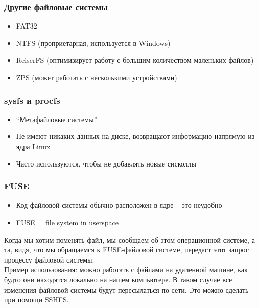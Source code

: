   \subsubsection{Другие файловые системы}
    \begin{itemize}
      \item FAT32
      \item NTFS (проприетарная, используется в Windows)
      \item ReiserFS (оптимизирует работу с большим количеством маленьких файлов)
      \item ZPS (может работать с несколькими устройствами)
    \end{itemize}
  
  \subsubsection{sysfs и procfs}
    \begin{itemize}
      \item ``Метафайловые системы''
      \item Не имеют никаких данных на диске, возвращают информацию напрямую из ядра Linux
      \item Часто используются, чтобы не добавлять новые сисколлы
    \end{itemize}

  \subsubsection{FUSE}
    \begin{itemize}
      \item Код файловой системы обычно расположен в ядре -- это неудобно
      \item FUSE = file system in userspace
    \end{itemize}
    Когда мы хотим поменять файл, мы сообщаем об этом операционной системе, а та, видя, что мы обращаемся к FUSE-файловой системе, передаст этот запрос процессу файловой системы.\\
    Пример использования: можно работать с файлами на удаленной машине, как будто они находятся локально на нашем компьютере.  В таком случае все изменения файловой системы будут пересылаться по сети. Это можно сделать при помощи SSHFS.
  

